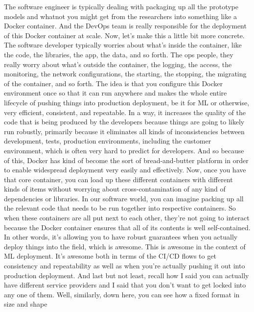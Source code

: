 {{{{{    The software engineer is typically dealing
    with packaging up all the prototype models
    and whatnot you might get from the researchers
    into something like a Docker container.
    And the DevOps team is really responsible for the deployment
    of this Docker container at scale.
    Now, let's make this a little bit more concrete.
    The software developer typically worries about what's
    inside the container, like the code, the libraries, the app, the data,
    and so forth.
    The ops people, they really worry about what's
    outside the container, the logging, the access, the monitoring, the network
    configurations, the starting, the stopping, the migrating
    of the container, and so forth.
    The idea is that you configure this Docker environment
    once so that it can run anywhere and makes
    the whole entire lifecycle of pushing things into production deployment,
    be it for ML or otherwise, very efficient, consistent, and repeatable.
    In a way, it increases the quality of the code
    that is being produced by the developers because things are going to likely run
    robustly, primarily because it eliminates all kinds of inconsistencies
    between development, tests, production environments, including the customer
    environment, which is often very hard to predict for developers.
    And so because of this, Docker has kind of
    become the sort of bread-and-butter platform
    in order to enable widespread deployment very easily and effectively.
    Now, once you have that core container, you
    can load up these different containers with different kinds of items
    without worrying about cross-contamination
    of any kind of dependencies or libraries.
    In our software world, you can imagine packing up
    all the relevant code that needs to be run together
    into respective containers.
    So when these containers are all put next to each other,
    they're not going to interact because the Docker container ensures that all
    of its contents is well self-contained.
    In other words, it's allowing you to have robust guarantees
    when you actually deploy things into the field, which is awesome.
    This is awesome in the context of ML deployment.
    It's awesome both in terms of the CI/CD flows
    to get consistency and repeatability as well
    as when you're actually pushing it out into production deployment.
    And last but not least, recall how I said
    you can actually have different service providers
    and I said that you don't want to get locked into any one of them.
    Well, similarly, down here, you can see how a fixed format in size and shape
}}}}}
